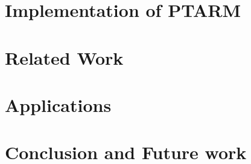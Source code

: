 \documentclass[11pt]{ucthesis}
\begin{document}
\chapter{Implementation of PTARM}
\label{chapter:ptarm}


\chapter{Related Work}
\label{chapter:related}


\chapter{Applications}
\label{chapter:app}


\chapter{Conclusion and Future work}
\label{chapter:summary}



  

\end{document}
